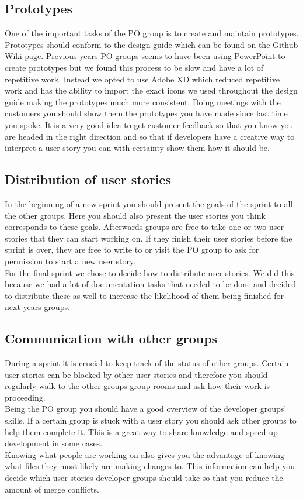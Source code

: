 \subsection{Prototypes}
One of the important tasks of the PO group is to create and maintain prototypes.
Prototypes should conform to the design guide which can be found on the Github Wiki-page.
Previous years PO groups seems to have been using PowerPoint to create prototypes but we found this process to be slow and have a lot of repetitive work.
Instead we opted to use Adobe XD which reduced repetitive work and has the ability to import the exact icons we used throughout the design guide making the prototypes much more consistent.
Doing meetings with the customers you should show them the prototypes you have made since last time you spoke.
It is a very good idea to get customer feedback so that you know you are headed in the right direction and so that if developers have a creative way to interpret a user story you can with certainty show them how it should be.

\subsection{Distribution of user stories}
In the beginning of a new sprint you should present the goals of the sprint to all the other groups.
Here you should also present the user stories you think corresponds to these goals.
Afterwards groups are free to take one or two user stories that they can start working on.
If they finish their user stories before the sprint is over, they are free to write to or visit the PO group to ask for permission to start a new user story.
\\
For the final sprint we chose to decide how to distribute user stories.
We did this because we had a lot of documentation tasks that needed to be done and decided to distribute these as well to increase the likelihood of them being finished for next years groups.


\subsection{Communication with other groups}
During a sprint it is crucial to keep track of the status of other groups.
Certain user stories can be blocked by other user stories and therefore you should regularly walk to the other groups group rooms and ask how their work is proceeding.
\\
Being the PO group you should have a good overview of the developer groups' skills.
If a certain group is stuck with a user story you should ask other groups to help them complete it.
This is a great way to share knowledge and speed up development in some cases.
\\
Knowing what people are working on also gives you the advantage of knowing what files they most likely are making changes to.
This information can help you decide which user stories developer groups should take so that you reduce the amount of merge conflicts.


